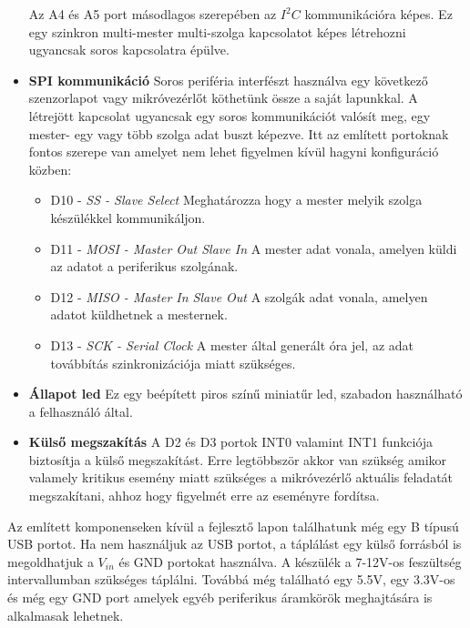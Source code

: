 \documentclass[a4paper,12pt]{article}
\begin{document}
\begin{itemize}
	Az A4 és A5 port másodlagos szerepében az $I^{2}C$ kommunikációra képes. 
	Ez egy szinkron multi-mester multi-szolga kapcsolatot képes létrehozni ugyancsak soros kapcsolatra épülve.
	\item \textbf{SPI kommunikáció}
	Soros periféria interfészt használva egy következő szenzorlapot vagy mikróvezérlőt köthetünk össze a saját lapunkkal. 
	A létrejött kapcsolat ugyancsak egy soros kommunikációt valósít meg, egy mester- egy vagy több szolga adat buszt képezve.
	Itt az említett portoknak fontos szerepe van amelyet nem lehet figyelmen kívül hagyni konfiguráció közben:
		\begin{itemize}
			\item D10 - \textit{SS - Slave Select}
			Meghatározza hogy a mester melyik szolga készülékkel kommunikáljon.
			\item D11 - \textit{MOSI - Master Out Slave In}
			A mester adat vonala, amelyen küldi az adatot a periferikus szolgának.
			\item D12 - \textit{MISO - Master In Slave Out}
			A szolgák adat vonala, amelyen adatot küldhetnek a mesternek.
			\item D13 - \textit{SCK - Serial Clock}
			A mester által generált óra jel, az adat továbbítás szinkronizációja miatt szükséges.
		\end{itemize}
	\item \textbf{Állapot led}
	Ez egy beépített piros színű miniatűr led, szabadon használható a felhasználó által.
	\item \textbf{Külső megszakítás}
	A D2 és D3 portok INT0 valamint INT1 funkciója biztosítja a külső megszakítást. 
	Erre legtöbbször akkor van szükség amikor valamely kritikus esemény miatt szükséges a mikróvezérlő aktuális feladatát megszakítani, ahhoz hogy figyelmét erre az eseményre fordítsa.
\end{itemize}

Az említett komponenseken kívül a fejlesztő lapon találhatunk még egy B típusú USB portot. 
Ha nem használjuk az USB portot, a táplálást egy külső forrásból is megoldhatjuk a $V_{in}$ és GND portokat használva.
A készülék a 7-12V-os feszültség intervallumban szükséges táplálni.
Továbbá még található egy 5.5V, egy 3.3V-os és még egy GND port amelyek egyéb periferikus áramkörök meghajtására is alkalmasak lehetnek.
\end{document}
